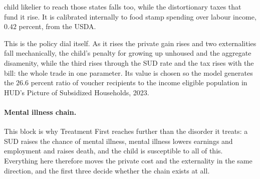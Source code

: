 \documentclass[10pt]{article}
\begin{document}
\begin{description}
child likelier to reach those states falls too, while the distortionary
taxes that fund it rise.
It is calibrated internally to food stamp spending over labour income,
$0.42$ percent, from the USDA.
\item[$\pi_V$, the chance of drawing a voucher.] This is the policy dial itself.
As it rises the private gain rises and two externalities fall
mechanically, the child's penalty for growing up unhoused and the aggregate
disamenity, while the third rises through the SUD rate and the tax rises with the
bill: the whole trade in one parameter. Its value is chosen so the model generates
the $26.6$ percent ratio of voucher recipients to the income eligible population in
HUD's Picture of Subsidized Households, 2023.
\end{description}

\paragraph{Mental illness chain.} This block is why Treatment First reaches
further than the disorder it treats: a SUD raises the chance of mental illness,
mental illness lowers earnings and employment and raises death, and the child
is susceptible to all of this. Everything here therefore moves
the private cost and the externality
in the same direction, and the first three decide whether the chain exists
at all.
\end{document}
